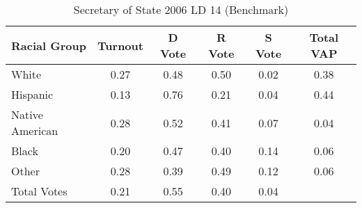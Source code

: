 \begin{table}[htb]
\begin{center}
\caption{Secretary of State 2006 LD 14 (Benchmark)}
\label{sos06_vap_ld_14_benchmark}
\begin{tabular}{lccccc}
  \hline
Racial Group & Turnout & D Vote & R Vote & S Vote & Total VAP \\ 
  \hline
White & 0.27 & 0.48 & 0.50 & 0.02 & 0.38 \\ 
  Hispanic & 0.13 & 0.76 & 0.21 & 0.04 & 0.44 \\ 
  Native American & 0.28 & 0.52 & 0.41 & 0.07 & 0.04 \\ 
  Black & 0.20 & 0.47 & 0.40 & 0.14 & 0.06 \\ 
  Other & 0.28 & 0.39 & 0.49 & 0.12 & 0.06 \\ 
  Total Votes & 0.21 & 0.55 & 0.40 & 0.04 &  \\ 
   \hline
\end{tabular}
\end{center}
\end{table}

